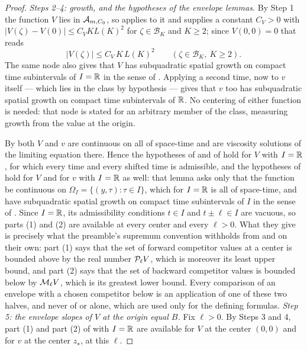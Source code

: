 \begin{proof}
\emph{Steps 2--4: growth, and the hypotheses of the envelope lemmas.}
By Step 1 the function $V$ lies in $\mathcal{A}_{m,C_0}$, so
 applies to it and supplies a constant $C_V>0$ with
$\bigl|V(\zeta)-V(0)\bigr|\le C_VKL(K)^2$ for $\zeta\in\mathcal B_K$ and
$K\ge2$; since $V(0,0)=0$ that reads
\begin{equation}\label{eq:sr-growth}
  |V(\zeta)|\le C_V\,K\,L(K)^2\qquad(\zeta\in\mathcal B_K,\ K\ge2).
\end{equation}
The same node also gives that $V$ has subquadratic spatial growth on compact
time subintervals of $I=\mathbb{R}$ in the sense of .
Applying  a second time, now to $v$ itself — which lies
in the class by hypothesis — gives that $v$ too has subquadratic spatial growth
on compact time subintervals of $\mathbb{R}$. No centering of either function is needed:
that node is stated for an arbitrary member of the class, measuring growth from
the value at the origin.

By  both $V$ and $v$ are continuous on all of space-time and
are viscosity solutions of the limiting equation there. Hence the hypotheses of
 and of  hold for $V$
with $I=\mathbb{R}$, for which every time and every shifted time is admissible, and the
hypotheses of  hold for $V$ and for $v$ with
$I=\mathbb{R}$ as well: that lemma asks only that the function be continuous on
$\Omega_I=\{(y,\tau):\tau\in I\}$, which for $I=\mathbb{R}$ is all of space-time, and
have subquadratic spatial growth on compact time subintervals of $I$ in the
sense of . Since $I=\mathbb{R}$, its admissibility
conditions $t\in I$ and $t\pm\ell\in I$ are vacuous, so parts (1) and (2) are
available at every center and every $\ell>0$. What they give is precisely what
the preamble's supremum convention withholds from  and
 on their own: part (1) says that the set of forward
competitor values at a center is bounded above by the real number
$\mathcal{P}_\ell V$, which is moreover its least upper bound, and part (2) says that
the set of backward competitor values is bounded below by $\mathcal{M}_\ell V$, which
is its greatest lower bound. Every comparison of an envelope with a chosen
competitor below is an application of one of these two halves, and never of
 or  alone, which are used only for the
defining formulas.
\emph{Step 5: the envelope slopes of $V$ at the origin equal $B$.}
Fix $\ell>0$. By Steps 3 and 4, part (1) and part (2) of
 with $I=\mathbb{R}$ are available for $V$ at the
center $(0,0)$ and for $v$ at the center $z_\star$, at this $\ell$.


\end{proof}
